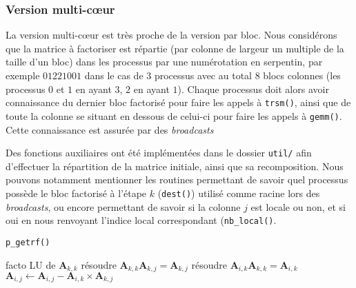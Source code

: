 \subsubsection{Version multi-cœur}

La version multi-cœur est très proche de la version par bloc. Nous considérons que la matrice à factoriser est répartie (par colonne de largeur un multiple de la taille d'un bloc) dans les processus par une numérotation en serpentin, par exemple $0 1 2 2 1 0 0 1$ dans le cas de 3 processus avec au total 8 blocs colonnes (les processus $0$ et $1$ en ayant $3$, $2$ en ayant $1$). Chaque processus doit alors avoir connaissance du dernier bloc factorisé pour faire les appels à \texttt{trsm()}, ainsi que de toute la colonne se situant en dessous de celui-ci pour faire les appels à \texttt{gemm()}. Cette connaissance est assurée par des \emph{broadcasts}

Des fonctions auxiliaires ont été implémentées dans le dossier \texttt{util/} afin d'effectuer la répartition de la matrice initiale, ainsi que sa recomposition. Nous pouvons notamment mentionner les routines permettant de savoir quel processus possède le bloc factorisé à l'étape $k$ (\texttt{dest()}) utilisé comme racine lors des \emph{broadcasts}, ou encore permettant de savoir si la colonne $j$ est locale ou non, et si oui en nous renvoyant l'indice local correspondant (\texttt{nb\_local()}.

\begin{algorithm}
\caption*{\texttt{p\_getrf()}}
\begin{algorithmic}
    \State facto LU de $\mathbf{A}_{k,k}$
        \State résoudre $\mathbf{A}_{k,k}\mathbf{A}_{k,j} = \mathbf{A}_{k,j}$
    \EndFor
            \State résoudre $\mathbf{A}_{i,k}\mathbf{A}_{k,k} = \mathbf{A}_{i,k}$
    \EndFor
            \State$\mathbf{A}_{i,j}\gets \mathbf{A}_{i,j} - \mathbf{A}_{i,k}\times \mathbf{A}_{k,j}$
        \EndFor
    \EndFor
\EndFor
\end{algorithmic}
\end{algorithm}


